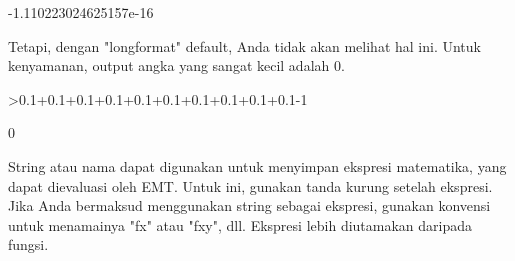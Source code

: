 \documentclass[a4paper,10pt]{article}
\begin{document}
\begin{eulernotebook}
\begin{euleroutput}
   -1.110223024625157e-16 
\end{euleroutput}
\begin{eulercomment}
Tetapi, dengan "longformat" default, Anda tidak akan melihat hal ini.
Untuk kenyamanan, output angka yang sangat kecil adalah 0.
\end{eulercomment}
\begin{eulerprompt}
>0.1+0.1+0.1+0.1+0.1+0.1+0.1+0.1+0.1+0.1-1
\end{eulerprompt}
\begin{euleroutput}
  0
\end{euleroutput}
\begin{eulercomment}
String atau nama dapat digunakan untuk menyimpan ekspresi matematika,
yang dapat dievaluasi oleh EMT. Untuk ini, gunakan tanda kurung
setelah ekspresi. Jika Anda bermaksud menggunakan string sebagai
ekspresi, gunakan konvensi untuk menamainya "fx" atau "fxy", dll.
Ekspresi lebih diutamakan daripada fungsi.


\end{eulercomment}
\end{eulernotebook}
\end{document}
